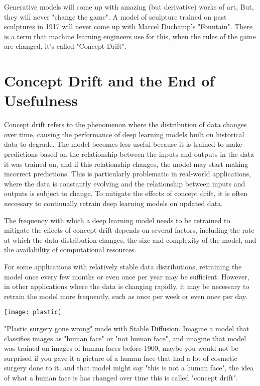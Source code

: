 Generative models will come up with amazing (but derivative) works of art, But, they will never "change the game". A model of sculpture trained on past sculptures in 1917 will never come up with Marcel Duchamp's "Fountain". There is a term that machine learning engineers use for this, when the rules of the game are changed, it's called "Concept Drift".

\section{Concept Drift and the End of Usefulness}

Concept drift refers to the phenomenon where the distribution of data changes over time, causing the performance of deep learning models built on historical data to degrade. The model becomes less useful because it is trained to make predictions based on the relationship between the inputs and outputs in the data it was trained on, and if this relationship changes, the model may start making incorrect predictions. This is particularly problematic in real-world applications, where the data is constantly evolving and the relationship between inputs and outputs is subject to change. To mitigate the effects of concept drift, it is often necessary to continually retrain deep learning models on updated data.

The frequency with which a deep learning model needs to be retrained to mitigate the effects of concept drift depends on several factors, including the rate at which the data distribution changes, the size and complexity of the model, and the availability of computational resources.

For some applications with relatively stable data distributions, retraining the model once every few months or even once per year may be sufficient. However, in other applications where the data is changing rapidly, it may be necessary to retrain the model more frequently, such as once per week or even once per day.

\begin{marginfigure}[-5.5cm]
        \texttt{[image: plastic]}
        \caption{"Plastic surgery gone wrong" made with Stable Diffusion. Imagine a model that classifies images as "human face" or "not human face", and imagine that model was trained on images of human faces before 1900, maybe you would not be surprised if you gave it a picture of a human face that had a lot of cosmetic surgery done to it, and that model might say "this is not a human face", the idea of what a human face is has changed over time this is called "concept drift".}
\end{marginfigure}

